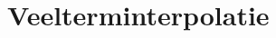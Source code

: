 \documentclass[samenvatting.tex]{subfiles}
\begin{document}
\chapter{Veelterminterpolatie}
\end{document}
